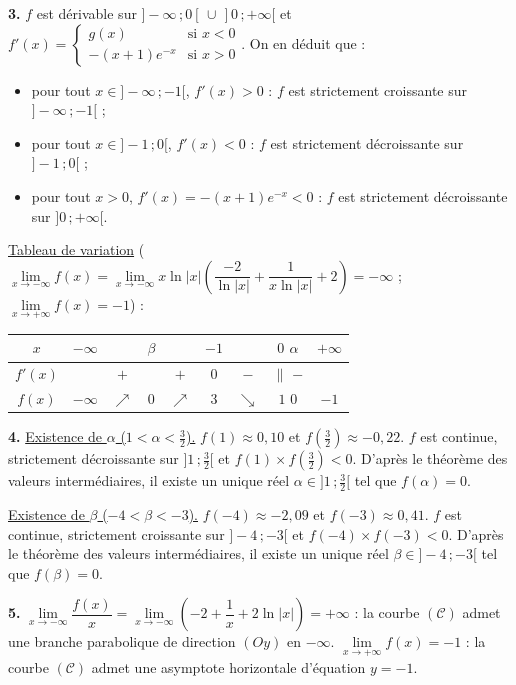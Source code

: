 \documentclass[11pt]{article}
\begin{document}
\textbf{3.} $f$ est dérivable sur $]-\infty\,;0[\,\cup\,]0\,;+\infty[$ et $f'(x) = \begin{cases} g(x) & \text{si } x < 0 \\ -(x+1)e^{-x} & \text{si } x > 0 \end{cases}$. On en déduit que :
\begin{itemize}
  \item pour tout $x \in ]-\infty\,;-1[$, $f'(x) > 0$ : $f$ est strictement croissante sur $]-\infty\,;-1[$ ;
  \item pour tout $x \in ]-1\,;0[$, $f'(x) < 0$ : $f$ est strictement décroissante sur $]-1\,;0[$ ;
  \item pour tout $x > 0$, $f'(x) = -(x+1)e^{-x} < 0$ : $f$ est strictement décroissante sur $]0\,;+\infty[$.
\end{itemize}

\underline{Tableau de variation} ($\lim\limits_{x\to-\infty} f(x) = \lim\limits_{x\to-\infty} x\ln|x|\left(\dfrac{-2}{\ln|x|} + \dfrac{1}{x\ln|x|} + 2\right) = -\infty$ ; $\lim\limits_{x\to+\infty} f(x) = -1$) :
\begin{center}\renewcommand{\arraystretch}{1.4}
\begin{tabular}{|c|cccccccc|}
\hline
$x$ & $-\infty$ & & $\beta$ & & $-1$ & & $0$ \quad $\alpha$ & $+\infty$ \\
\hline
$f'(x)$ & & $+$ & & $+$ & $0$ & $-$ & $\|$ \quad\; $-$ & \\
\hline
$f(x)$ & $-\infty$ & $\nearrow$ & $0$ & $\nearrow$ & $3$ & $\searrow$ & $1$ \quad $0$ & $-1$ \\
\hline
\end{tabular}
\end{center}

\textbf{4.} \underline{Existence de $\alpha$ ($1 < \alpha < \frac{3}{2}$).} $f(1) \approx 0{,}10$ et $f\left(\frac{3}{2}\right) \approx -0{,}22$. $f$ est continue, strictement décroissante sur $]1\,;\frac{3}{2}[$ et $f(1) \times f\left(\frac{3}{2}\right) < 0$. D'après le théorème des valeurs intermédiaires, il existe un unique réel $\alpha \in ]1\,;\frac{3}{2}[$ tel que $f(\alpha) = 0$.

\underline{Existence de $\beta$ ($-4 < \beta < -3$).} $f(-4) \approx -2{,}09$ et $f(-3) \approx 0{,}41$. $f$ est continue, strictement croissante sur $]-4\,;-3[$ et $f(-4) \times f(-3) < 0$. D'après le théorème des valeurs intermédiaires, il existe un unique réel $\beta \in ]-4\,;-3[$ tel que $f(\beta) = 0$.

\textbf{5.} $\lim\limits_{x\to-\infty}\dfrac{f(x)}{x} = \lim\limits_{x\to-\infty}\left(-2 + \dfrac{1}{x} + 2\ln|x|\right) = +\infty$ : la courbe $(\mathscr{C})$ admet une branche parabolique de direction $(Oy)$ en $-\infty$. $\lim\limits_{x\to+\infty} f(x) = -1$ : la courbe $(\mathscr{C})$ admet une asymptote horizontale d'équation $y = -1$.
\end{document}
